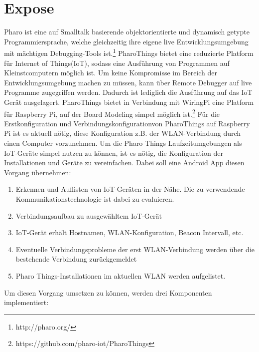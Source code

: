 \section{Expose}
    Pharo ist eine auf Smalltalk basierende objektorientierte und dynamisch getypte Programmiersprache,
    welche gleichzeitig ihre eigene live Entwicklungsumgebung mit mächtigen Debugging-Tools ist.\footnote{http://pharo.org/}
    PharoThings bietet eine reduzierte Platform für  Internet of Things(IoT), sodass eine Ausführung von Programmen auf Kleinstcomputern möglich ist.
    Um keine Kompromisse im Bereich der Entwicklungsumgebung machen zu müssen, kann über Remote Debugger auf live Programme zugegriffen werden.
    Dadurch ist lediglich die Ausführung auf das IoT Gerät ausgelagert. PharoThings bietet in Verbindung mit WiringPi eine Platform für Raspberry Pi,
    auf der Board Modeling simpel möglich ist.\footnote{https://github.com/pharo-iot/PharoThings}
    Für die Erstkonfiguration und Verbindungskonfigurationvon PharoThings auf Raspberry Pi ist es aktuell nötig,
    diese Konfiguration z.B. der WLAN-Verbindung durch einen Computer vorzunehmen.
    Um die Pharo Things Laufzeitumgebungen als IoT-Geräte simpel nutzen zu können, ist es nötig,
    die Konfiguration der Installationen und Geräte zu vereinfachen. Dabei soll eine Android App diesen Vorgang übernehmen:
    \begin{enumerate}
        \item Erkennen und Auflisten von IoT-Geräten in der Nähe. Die zu verwendende Kommunikationstechnologie ist dabei zu evaluieren.
        \item Verbindungsaufbau zu ausgewähltem IoT-Gerät
        \item IoT-Gerät erhält Hostnamen, WLAN-Konfiguration, Beacon Intervall, etc.
        \item Eventuelle Verbindungsprobleme der erst WLAN-Verbindung werden über die bestehende Verbindung zurückgemeldet
        \item Pharo Things-Installationen im aktuellen WLAN werden aufgelistet.
    \end{enumerate}
    Um diesen Vorgang umsetzen zu können, werden drei Komponenten implementiert:
